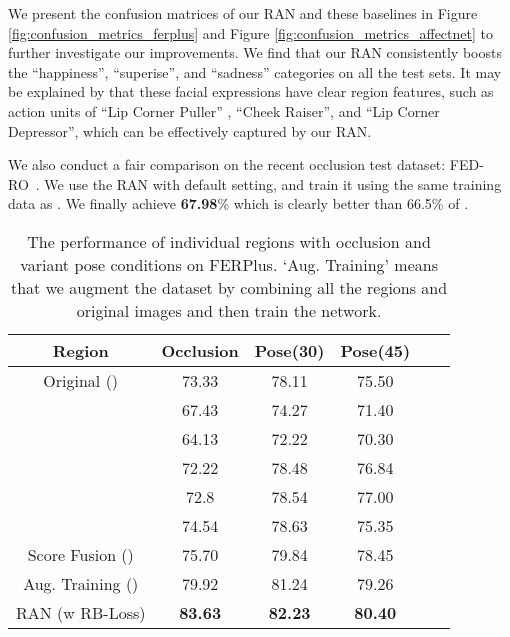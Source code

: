 \documentclass[journal]{IEEEtran}
\newcommand{\rpxj}[1]{\textcolor[rgb]{0,0,0}{#1}}
\begin{document}
We present the confusion matrices of our RAN and these baselines in Figure \ref{fig:confusion_metrics_ferplus} and Figure \ref{fig:confusion_metrics_affectnet} to further investigate our improvements. We find that our RAN consistently boosts the ``happiness'', ``superise'', and ``sadness'' categories on all the test sets. It may be explained by that these facial expressions have clear region features, such as action units of  ``Lip Corner Puller'' , ``Cheek Raiser'', and ``Lip Corner Depressor'', which can be effectively captured by our RAN. 

We also conduct a fair comparison on the recent occlusion test dataset: FED-RO~\cite{8576656}. We use the RAN with default setting, and train it using the same training data as \cite{8576656}. We finally achieve \textbf{67.98}\% which is clearly better than 66.5\% of \cite{8576656}.

\begin{table}[t]
\center
\caption{\rpxj{The performance of individual regions with occlusion and variant pose conditions on FERPlus. `Aug. Training' means that we augment the dataset by combining all the regions and original images  and then train the network.}}
\begin{tabular}{@{}cccccc@{}}
\hline
\toprule
Region         & Occlusion & Pose(30) & Pose(45) \\ \midrule
Original ()       &     73.33      &        78.11       &       75.50        \\
        &    67.43       &        74.27       &       71.40
     \\
          &    64.13       &        72.22       &       70.30
     \\
         &    72.22       &        78.48       &       76.84
     \\
          &    72.8       &        78.54       &       77.00
     \\
         &    74.54       &       78.63       &       75.35
     \\
Score Fusion ()  &   75.70      &         79.84      &        78.45
      \\
Aug. Training ()  &   79.92      &         81.24      &     79.26
      \\
RAN (w RB-Loss) &     \textbf{83.63}      &        \textbf{82.23}          &       \textbf{80.40 }          \\
 \bottomrule
\end{tabular}
\label{tab:region}
\end{table}
\end{document}
